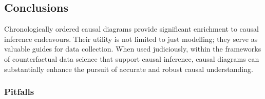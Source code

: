 \documentclass[
  singlecolumn,
  9pt]{article}
\begin{document}
\subsection{Conclusions}\label{conclusions}

Chronologically ordered causal diagrams provide significant enrichment
to causal inference endeavours. Their utility is not limited to just
modelling; they serve as valuable guides for data collection. When used
judiciously, within the frameworks of counterfactual data science that
support causal inference, causal diagrams can substantially enhance the
pursuit of accurate and robust causal understanding.

\subsubsection{Pitfalls}\label{pitfalls}
\end{document}
